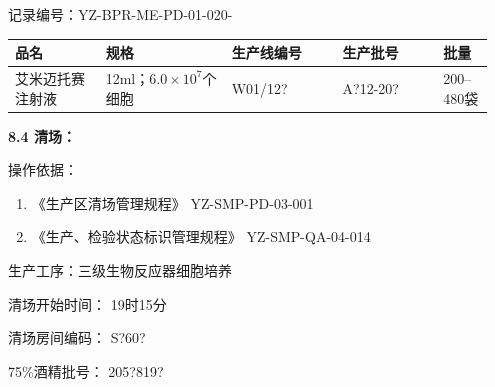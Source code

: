 \documentclass[UTF8,10pt,a4paper,fontset=fandol]{ctexart}
\newcommand{\fieldvalue}[1]{#1}
\newcommand{\handwritten}[1]{#1}
\begin{document}
记录编号：YZ-BPR-ME-PD-01-020-

\begin{tabular}{|p{0.18\linewidth}|p{0.25\linewidth}|p{0.22\linewidth}|p{0.20\linewidth}|p{0.10\linewidth}|}
\hline
品名 & 规格 & 生产线编号 & 生产批号 & 批量 \\
\hline
艾米迈托赛注射液 & 12ml；$6.0\times10^{7}$个细胞 &
\fieldvalue{\handwritten{W01/12?}} &
\fieldvalue{\handwritten{A?12-20?}} &
200--480袋 \\
\hline
\end{tabular}

\medskip

\textbf{8.4 清场：}

\medskip

操作依据：

\begin{enumerate}
\item 《生产区清场管理规程》 \hfill YZ-SMP-PD-03-001
\item 《生产、检验状态标识管理规程》 \hfill YZ-SMP-QA-04-014
\end{enumerate}

生产工序：三级生物反应器细胞培养

清场开始时间：
\fieldvalue{\handwritten{19时15分}}

清场房间编码：
\fieldvalue{\handwritten{S?60?}}

75\%酒精批号：
\fieldvalue{\handwritten{205?819?}}
\end{document}
